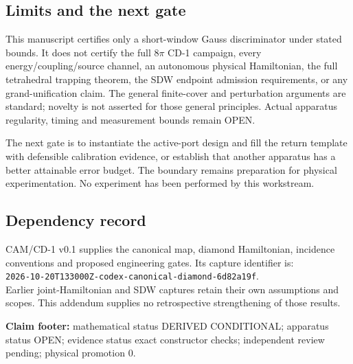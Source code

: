 \documentclass[10pt,a4paper]{article}
\begin{document}
\subsection*{Limits and the next gate}
This manuscript certifies only a short-window Gauss discriminator under stated bounds. It does not certify the full $8\pi$ CD-1 campaign, every energy/coupling/source channel, an autonomous physical Hamiltonian, the full tetrahedral trapping theorem, the SDW endpoint admission requirements, or any grand-unification claim. The general finite-cover and perturbation arguments are standard; novelty is not asserted for those general principles. Actual apparatus regularity, timing and measurement bounds remain OPEN.

The next gate is to instantiate the active-port design and fill the return template with defensible calibration evidence, or establish that another apparatus has a better attainable error budget. The boundary remains preparation for physical experimentation. No experiment has been performed by this workstream.

\subsection*{Dependency record}
CAM/CD-1 v0.1 supplies the canonical map, diamond Hamiltonian, incidence conventions and proposed engineering gates. Its capture identifier is:\\
\texttt{2026-10-20T133000Z-codex-canonical-diamond-6d82a19f}.\\
Earlier joint-Hamiltonian and SDW captures retain their own assumptions and scopes. This addendum supplies no retrospective strengthening of those results.

\vfill
\noindent\textbf{Claim footer:} mathematical status DERIVED CONDITIONAL; apparatus status OPEN; evidence status exact constructor checks; independent review pending; physical promotion 0.
\newpage
\end{document}
